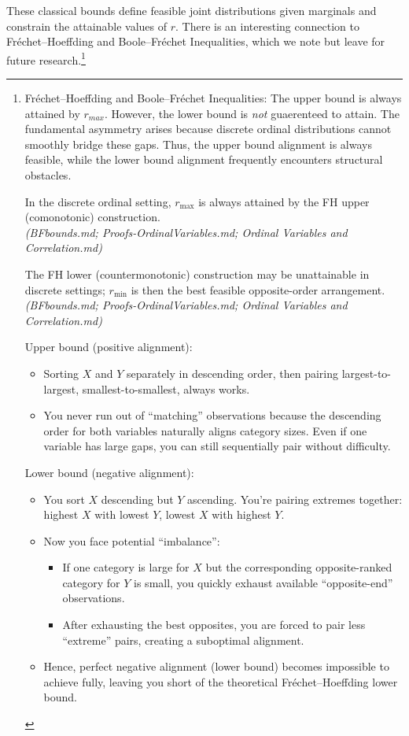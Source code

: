 \documentclass[
  12pt,
]{article}
\theoremstyle{plain}
\theoremstyle{definition}
\theoremstyle{remark}
\begin{document}
These classical bounds define feasible joint distributions given
marginals and constrain the attainable values of \(r\). There is an
interesting connection to Fréchet--Hoeffding and Boole--Fréchet
Inequalities, which we note but leave for future research.\footnote{Fréchet--Hoeffding
  and Boole--Fréchet Inequalities: The upper bound is always attained by
  \(r_{max}\). However, the lower bound is \emph{not} guaerenteed to
  attain. The fundamental asymmetry arises because discrete ordinal
  distributions cannot smoothly bridge these gaps. Thus, the upper bound
  alignment is always feasible, while the lower bound alignment
  frequently encounters structural obstacles.

  In the discrete ordinal setting, \(r_{\max}\) is always attained by
  the FH upper (comonotonic) construction.\\
  \emph{(BFbounds.md; Proofs-OrdinalVariables.md; Ordinal Variables and
  Correlation.md)}

  The FH lower (countermonotonic) construction may be unattainable in
  discrete settings; \(r_{\min}\) is then the best feasible
  opposite-order arrangement.\\
  \emph{(BFbounds.md; Proofs-OrdinalVariables.md; Ordinal Variables and
  Correlation.md)}

  Upper bound (positive alignment):

  \begin{itemize}
  \item
    Sorting \(X\) and \(Y\) separately in descending order, then pairing
    largest-to-largest, smallest-to-smallest, always works.
  \item
    You never run out of ``matching'' observations because the
    descending order for both variables naturally aligns category sizes.
    Even if one variable has large gaps, you can still sequentially pair
    without difficulty.
  \end{itemize}

  Lower bound (negative alignment):

  \begin{itemize}
  \item
    You sort \(X\) descending but \(Y\) ascending. You're pairing
    extremes together: highest \(X\) with lowest \(Y\), lowest \(X\)
    with highest \(Y\).
  \item
    Now you face potential ``imbalance'':

    \begin{itemize}
    \item
      If one category is large for \(X\) but the corresponding
      opposite-ranked category for \(Y\) is small, you quickly exhaust
      available ``opposite-end'' observations.
    \item
      After exhausting the best opposites, you are forced to pair less
      ``extreme'' pairs, creating a suboptimal alignment.
    \end{itemize}
  \item
    Hence, perfect negative alignment (lower bound) becomes impossible
    to achieve fully, leaving you short of the theoretical
    Fréchet--Hoeffding lower bound.
  \end{itemize}}
\end{document}

